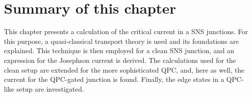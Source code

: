 \section{Summary of this chapter}
This chapter presents a calculation of the critical current in a SNS junctions. For this purpose, a quasi-classical transport theory is used and its foundations are explained. This technique is then employed for a clean SNS junction, and an expression for the Josephson current is derived. The calculations used for the clean setup are extended for the more sophisticated QPC, and, here as well, the current for the QPC-gated junction is found. Finally, the edge states in a QPC-like setup are investigated. 